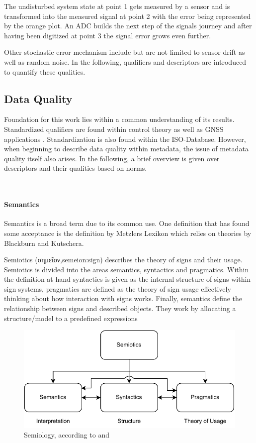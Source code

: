 The undisturbed system state at point 1 gets measured by a sensor and is transformed into the measured signal at point 2 with the error being represented by the orange plot. An ADC builds the next step of the signals journey and after having been digitized at point 3 the signal error grows even further.

Other stochastic error mechanism include but are not limited to sensor drift as well as random noise. In the following, qualifiers and descriptors are introduced to quantify these qualities.

\subsection{Data Quality}

Foundation for this work lies within a common understanding of its results. Standardized qualifiers are found within control theory \cite{isermann_fault-diagnosis_2011} as well as GNSS applications \cite{teunissen_springer_2017}. Standardization is also found within the ISO-Database. However, when beginning to describe data quality within metadata, the issue of metadata quality itself also arises. In the following, a brief overview is given over descriptors and their qualities based on norms.

\

\paragraph{Semantics}
Semantics is a broad term due to its common use. One definition that has found some acceptance is the definition by Metzlers Lexikon which relies on theories by Blackburn and Kutschera. \cite{shoemaker_spreading_1987,kutschera_sprachphilosophie_1975}


Semiotics (\textgreek{σημεῖον},semeion:sign) describes the theory of signs and their usage. Semiotics is divided into the areas semantics, syntactics and pragmatics. Within the definition at hand syntactics is given as the internal structure of signs within sign systems, pragmatics are defined as the theory of sign usage effectively thinking about how interaction with signs works. Finally, semantics define the relationship between signs and described objects. They work by allocating a structure/model to a predefined expressions

\begin{figure}
    \centering
    \includegraphics[width=.7\textwidth]{03_figures/semiotics.pdf}
    \caption{Semiology, according to \textcite{kutschera_sprachphilosophie_1975} and \textcite{shoemaker_spreading_1987}}
\end{figure}

